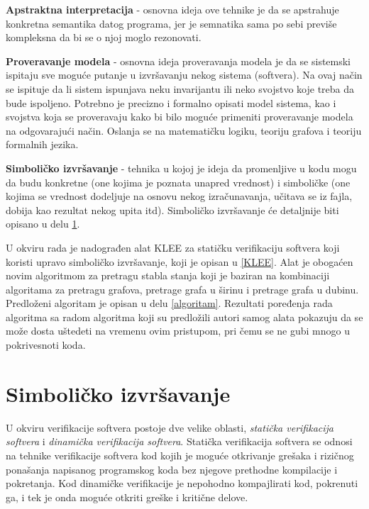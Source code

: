 \documentclass[12pt,oneside]{memoir}
\begin{document}
\begin{description}
    \item \textbf{Apstraktna interpretacija} \cite{abstract_interpretation} - osnovna ideja ove tehnike je da se apstrahuje konkretna semantika datog programa, jer je semnatika sama po sebi previše kompleksna da bi se o njoj moglo rezonovati.

    \item \textbf{Proveravanje modela} \cite{model_checking} - osnovna ideja proveravanja modela je da se sistemski ispitaju sve moguće putanje u izvršavanju nekog sistema (softvera). Na ovaj način se ispituje da li sistem ispunjava neku invarijantu ili neko svojstvo koje treba da bude ispoljeno. Potrebno je precizno i formalno opisati model sistema, kao i svojstva koja se proveravaju kako bi bilo moguće primeniti proveravanje modela na odgovarajući način. Oslanja se na matematičku logiku, teoriju grafova i teoriju formalnih jezika.
    
    \item \textbf{Simboličko izvršavanje} - tehnika u kojoj je ideja da promenljive u kodu mogu da budu konkretne (one kojima je poznata unapred vrednost) i simboličke (one kojima se vrednost dodeljuje na osnovu nekog izračunavanja, učitava se iz fajla, dobija kao rezultat nekog upita itd). Simboličko izvršavanje će detaljnije biti opisano u delu \ref{chp:simbolicko_izvrsavanje}.
    
\end{description}

U okviru rada je nadograđen alat KLEE za statičku verifikaciju softvera koji koristi upravo simboličko izvršavanje, koji je opisan u \ref{KLEE}. Alat je obogaćen novim algoritmom za pretragu stabla stanja koji je baziran na kombinaciji algoritama za pretragu grafova, pretrage grafa u širinu i pretrage grafa u dubinu. Predloženi algoritam je opisan u delu \ref{algoritam}. Rezultati poređenja rada algoritma sa radom algoritma koji su predložili autori samog alata pokazuju da se može dosta uštedeti na vremenu ovim pristupom, pri čemu se ne gubi mnogo u pokrivesnoti koda.

\chapter{Simboličko izvršavanje} \label{chp:simbolicko_izvrsavanje}
U okviru verifikacije softvera postoje dve velike oblasti, \textit{statička verifikacija softvera} i \textit{dinamička verifikacija softvera}. Statička verifikacija softvera se odnosi na tehnike verifikacije softvera kod kojih je moguće otkrivanje grešaka i rizičnog ponašanja napisanog programskog koda bez njegove prethodne kompilacije i pokretanja. Kod dinamičke verifikacije je nepohodno kompajlirati kod, pokrenuti ga, i tek je onda moguće otkriti greške i kritične delove. 
\end{document}
